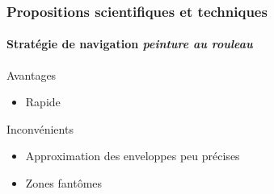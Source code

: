\documentclass{beamer}
\begin{document}
			\begin{frame}
				\frametitle{Propositions scientifiques et techniques}
				\framesubtitle{Stratégie de navigation \textit{peinture au rouleau}}
				\begin{exampleblock}{Avantages}
					\begin{itemize}
						\item Rapide
					\end{itemize}
				\end{exampleblock}
				\begin{alertblock}{Inconvénients}
					\begin{itemize}
						\item Approximation des enveloppes peu précises
						\item Zones fantômes
					\end{itemize}
				\end{alertblock}
			\end{frame}
\end{document}
